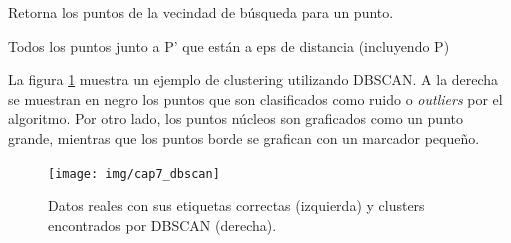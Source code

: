 \begin{algorithm}[H]
  \caption{Retorna los puntos de la vecindad de búsqueda para un punto.
    \label{alg:regionDeConsulta}}
  \begin{algorithmic}[1]
    
    \Return Todos los puntos junto a P' que están a eps de distancia (incluyendo P)
    \EndFunction
  \end{algorithmic}
\end{algorithm}

La figura \ref{fig:dbscan} muestra un ejemplo de clustering utilizando DBSCAN. A la derecha se muestran en negro los puntos que son clasificados como ruido o \emph{outliers} por el algoritmo. Por otro lado, los puntos núcleos son graficados como un punto grande, mientras que los puntos borde se grafican con un marcador pequeño.

\begin{figure}[H]
  \centering
  \texttt{[image: img/cap7\_dbscan]}
  \caption{Datos reales con sus etiquetas correctas (izquierda) y clusters encontrados por DBSCAN (derecha).}
  \label{fig:dbscan}
\end{figure}
